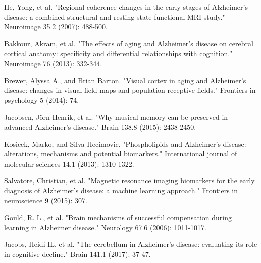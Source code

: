 \documentclass[journal]{IEEEtran}
\begin{document}
\begin{thebibliography}{1}
		He, Yong, et al. "Regional coherence changes in the early stages of Alzheimer’s disease: a combined structural and resting-state functional MRI study." Neuroimage 35.2 (2007): 488-500.
		
		
		
		Bakkour, Akram, et al. "The effects of aging and Alzheimer's disease on cerebral cortical anatomy: specificity and differential relationships with cognition." Neuroimage 76 (2013): 332-344.
		
		Brewer, Alyssa A., and Brian Barton. "Visual cortex in aging and Alzheimer's disease: changes in visual field maps and population receptive fields." Frontiers in psychology 5 (2014): 74.
		
		Jacobsen, Jörn-Henrik, et al. "Why musical memory can be preserved in advanced Alzheimer’s disease." Brain 138.8 (2015): 2438-2450.
		
		Kosicek, Marko, and Silva Hecimovic. "Phospholipids and Alzheimer’s disease: alterations, mechanisms and potential biomarkers." International journal of molecular sciences 14.1 (2013): 1310-1322.
		
		Salvatore, Christian, et al. "Magnetic resonance imaging biomarkers for the early diagnosis of Alzheimer's disease: a machine learning approach." Frontiers in neuroscience 9 (2015): 307.
		
		Gould, R. L., et al. "Brain mechanisms of successful compensation during learning in Alzheimer disease." Neurology 67.6 (2006): 1011-1017.
		
		Jacobs, Heidi IL, et al. "The cerebellum in Alzheimer’s disease: evaluating its role in cognitive decline." Brain 141.1 (2017): 37-47.
		
		
		
	\end{thebibliography}
	
	
\end{document}
